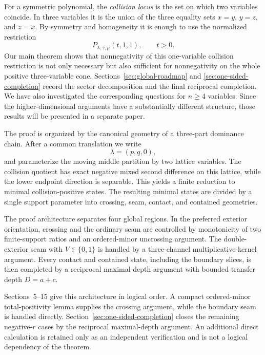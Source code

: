 \documentclass[11pt]{article}
\theoremstyle{definition}
\begin{document}
For a symmetric polynomial, the \emph{collision locus} is the set on which two variables coincide.  In three variables it is the union of the three equality sets \(x=y\), \(y=z\), and \(z=x\).  By symmetry and homogeneity it is enough to use the normalized restriction
\begin{equation*}
P_{\lambda,\gamma,\mu}(t,1,1),
\qquad t>0.
\end{equation*}
Our main theorem shows that nonnegativity of this one-variable collision restriction is not only necessary but also sufficient for nonnegativity on the whole positive three-variable cone.  Sections~\ref{sec:global-roadmap} and \ref{sec:one-sided-completion} record the sector decomposition and the final reciprocal completion.  We have also investigated the corresponding questions for \(n\ge4\) variables.  Since the higher-dimensional arguments have a substantially different structure, those results will be presented in a separate paper.

The proof is organized by the canonical geometry of a three-part dominance chain. After a common translation we write
\begin{equation*}
\lambda=(p,q,0),
\end{equation*}
and parameterize the moving middle partition by two lattice variables. The collision quotient has exact negative mixed second difference on this lattice, while the lower endpoint direction is separable. This yields a finite reduction to minimal collision-positive states. The resulting minimal states are divided by a single support parameter into crossing, seam, contact, and contained geometries.

The proof architecture separates four global regions.  In the preferred exterior orientation, crossing and the ordinary seam are controlled by monotonicity of two finite-support ratios and an ordered-minor uncrossing argument.  The double-exterior seam with \(V\in\{0,1\}\) is handled by a three-channel multiplicative-kernel argument.  Every contact and contained state, including the boundary slices, is then completed by a reciprocal maximal-depth argument with bounded transfer depth \(D=a+c\).

Sections~5--15 give this architecture in logical order.  A compact ordered-minor total-positivity lemma supplies the crossing argument, while the boundary seam is handled directly.  Section~\ref{sec:one-sided-completion} closes the remaining negative-\(r\) cases by the reciprocal maximal-depth argument.  An additional direct calculation is retained only as an independent verification and is not a logical dependency of the theorem.
\end{document}
